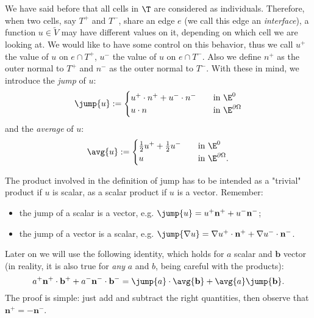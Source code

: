 We have said before that all cells in $\T$ are considered as individuals. Therefore, when two cells, say $T^+$ and $T^-$, share an edge $e$ (we call this edge an \emph{interface}), a function $u\in\tilde{V}$ may have different values on it, depending on which cell we are looking at. We would like to have some control on this behavior, thus we call $u^+$ the value of $u$ on $e \cap T^+$, $u^-$ the value of $u$ on $e \cap T^-$. Also we define $n^+$ as the outer normal to $T^+$ and $n^-$ as the outer normal to $T^-$. With these in mind, we introduce the \emph{jump} of $u$:
\[
\jump{u} := \begin{cases}
u^+ \cdot n^+ + u^- \cdot n^- \quad &\text{in $\E^0$} \\
u \cdot n \quad &\text{in $\E^{\partial\Omega}$}
\end{cases}
\]
and the \emph{average} of $u$:
\[
\avg{u} := \begin{cases}
\frac{1}{2} u^+ + \frac{1}{2} u^-  \quad &\text{in $\E^0$} \\
u \quad &\text{in $\E^{\partial\Omega}$}.
\end{cases}
\]
\begin{remark}
The product involved in the definition of jump has to be intended as a "trivial" product if $u$ is scalar, as a scalar product if $u$ is a vector. Remember:
\begin{itemize}
    \item the jump of a scalar is a vector, e.g. $\jump{u} = u^+ \mathbf{n^+} + u^- \mathbf{n^-}$;
    \item the jump of a vector is a scalar, e.g. $\jump{\nabla u} = \nabla u^+ \cdot \mathbf{n^+} + \nabla u^- \cdot \mathbf{n^-}$.
\end{itemize}
Later on we will use the following identity, which holds for $a$ scalar and $\mathbf{b}$ vector (in reality, it is also true for \emph{any} $a$ and $b$, being careful with the products):
\begin{equation}\label{eqn:jump_avg}
a^+ \mathbf{n^+} \cdot \mathbf{b^+} + a^- \mathbf{n^-} \cdot \mathbf{b^-} = \jump{a} \cdot \avg{\mathbf{b}} + \avg{a} \jump{\mathbf{b}}.
\end{equation}
The proof is simple: just add and subtract the right quantities, then observe that $\mathbf{n^+}=-\mathbf{n^-}$.
\end{remark}

